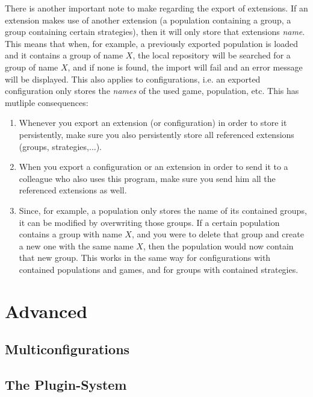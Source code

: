 \documentclass[parskip=full,11pt]{scrartcl}
\begin{document}
There is another important note to make regarding the export of extensions. If an extension makes use of another extension (a population containing a group, a group containing certain strategies), then it will only store that extensions \textit{name}. This means that when, for example, a previously exported population is loaded and it contains a group of name \(X\), the local repository will be searched for a group of name \(X\), and if none is found, the import will fail and an error message will be displayed. This also applies to configurations, i.e. an exported configuration only stores the \textit{names} of the used game, population, etc. This has mutliple consequences:
\begin{enumerate}
\item Whenever you export an extension (or configuration) in order to store it persistently, make sure you also persistently store all referenced extensions (groups, strategies,...).
\item When you export a configuration or an extension in order to send it to a colleague who also uses this program, make sure you send him all the referenced extensions as well.
\item Since, for example, a population only stores the name of its contained groups, it can be modified by overwriting those groups. If a certain population contains a group with name \(X\), and you were to delete that group and create a new one with the same name \(X\), then the population would now contain that new group. This works in the same way for configurations with contained populations and games, and for groups with contained strategies.
\end{enumerate}

\section{Advanced}

\subsection{Multiconfigurations}

\subsection{The Plugin-System}
\end{document}
